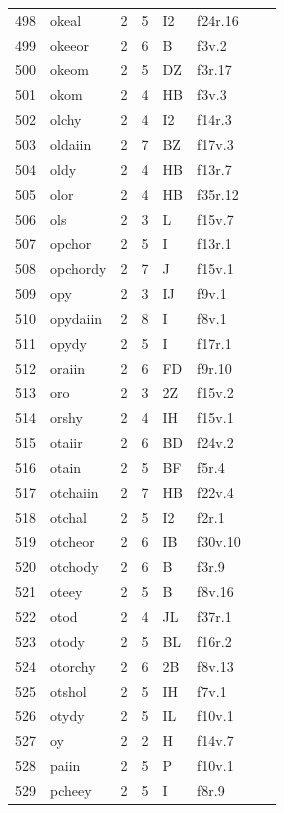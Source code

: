 \documentclass[11pt,a4paper]{article}
\begin{document}
\begin{landscape}
\begin{longtable}{@{}r>{\ttfamily}lrrl>{\ttfamily}l>{\raggedright\arraybackslash}p{80mm}>{\raggedright\arraybackslash}p{36mm}@{}}
498 & okeal & 2 & 5 & I2 & f24r.16 &  & \\
499 & okeeor & 2 & 6 & B & f3v.2 &  & \\
500 & okeom & 2 & 5 & DZ & f3r.17 &  & \\
501 & okom & 2 & 4 & HB & f3v.3 &  & \\
502 & olchy & 2 & 4 & I2 & f14r.3 &  & \\
503 & oldaiin & 2 & 7 & BZ & f17v.3 &  & \\
504 & oldy & 2 & 4 & HB & f13r.7 &  & \\
505 & olor & 2 & 4 & HB & f35r.12 &  & \\
506 & ols & 2 & 3 & L & f15v.7 &  & \\
507 & opchor & 2 & 5 & I & f13r.1 &  & \\
508 & opchordy & 2 & 7 & J & f15v.1 &  & \\
509 & opy & 2 & 3 & IJ & f9v.1 &  & \\
510 & opydaiin & 2 & 8 & I & f8v.1 &  & \\
511 & opydy & 2 & 5 & I & f17r.1 &  & \\
512 & oraiin & 2 & 6 & FD & f9r.10 &  & \\
513 & oro & 2 & 3 & 2Z & f15v.2 &  & \\
514 & orshy & 2 & 4 & IH & f15v.1 &  & \\
515 & otaiir & 2 & 6 & BD & f24v.2 &  & \\
516 & otain & 2 & 5 & BF & f5r.4 &  & \\
517 & otchaiin & 2 & 7 & HB & f22v.4 &  & \\
518 & otchal & 2 & 5 & I2 & f2r.1 &  & \\
519 & otcheor & 2 & 6 & IB & f30v.10 &  & \\
520 & otchody & 2 & 6 & B & f3r.9 &  & \\
521 & oteey & 2 & 5 & B & f8v.16 &  & \\
522 & otod & 2 & 4 & JL & f37r.1 &  & \\
523 & otody & 2 & 5 & BL & f16r.2 &  & \\
524 & otorchy & 2 & 6 & 2B & f8v.13 &  & \\
525 & otshol & 2 & 5 & IH & f7v.1 &  & \\
526 & otydy & 2 & 5 & IL & f10v.1 &  & \\
527 & oy & 2 & 2 & H & f14v.7 &  & \\
528 & paiin & 2 & 5 & P & f10v.1 &  & \\
529 & pcheey & 2 & 5 & I & f8r.9 &  & \\

\end{longtable}
\end{landscape}
\end{document}

